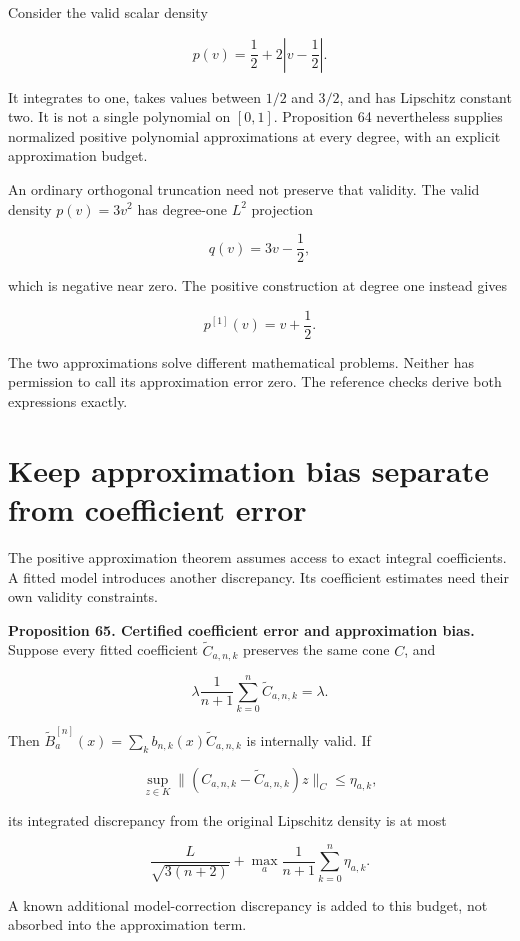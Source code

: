 Consider the valid scalar density

\[
p(v)=\frac12+2\left|v-\frac12\right|.
\]

It integrates to one, takes values between \(1/2\) and \(3/2\), and has
Lipschitz constant two. It is not a single polynomial on \([0,1]\).
Proposition 64 nevertheless supplies normalized positive polynomial
approximations at every degree, with an explicit approximation budget.

An ordinary orthogonal truncation need not preserve that validity. The
valid density \(p(v)=3v^2\) has degree-one \(L^2\) projection

\[
q(v)=3v-\frac12,
\]

which is negative near zero. The positive construction at degree one
instead gives

\[
p^{[1]}(v)=v+\frac12.
\]

The two approximations solve different mathematical problems. Neither
has permission to call its approximation error zero. The reference
checks derive both expressions exactly.

\section{Keep approximation bias separate from coefficient error}\label{LSM:keep-approximation-bias-separate-from-coefficient-error}

The positive approximation theorem assumes access to exact integral
coefficients. A fitted model introduces another discrepancy. Its
coefficient estimates need their own validity constraints.

\textbf{Proposition 65. Certified coefficient error and approximation
bias.} Suppose every fitted coefficient \(\widetilde C_{a,n,k}\)
preserves the same cone \(C\), and

\[
\lambda\frac1{n+1}\sum_{k=0}^n\widetilde C_{a,n,k}=\lambda.
\]

Then \(\widetilde B_a^{[n]}(x)=\sum_k b_{n,k}(x)\widetilde C_{a,n,k}\)
is internally valid. If

\[
\sup_{z\in K}\|(C_{a,n,k}-\widetilde C_{a,n,k})z\|_C
\leq\eta_{a,k},
\]

its integrated discrepancy from the original Lipschitz density is at
most

\[
\boxed{
\frac{L}{\sqrt{3(n+2)}}+
\max_a\frac1{n+1}\sum_{k=0}^n\eta_{a,k}.
}
\]

A known additional model-correction discrepancy is added to this budget,
not absorbed into the approximation term.

